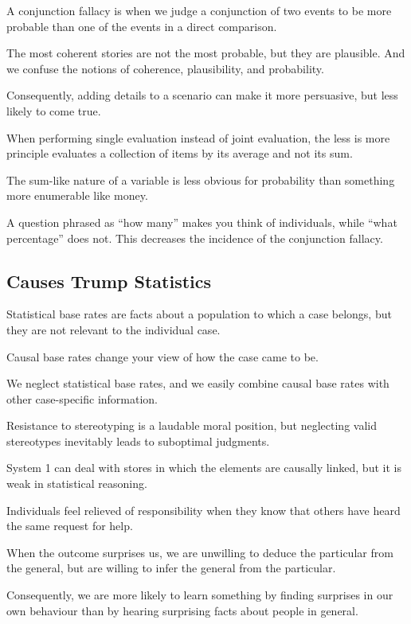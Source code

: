 \bit
\item A conjunction fallacy is when we judge a conjunction of two events to be more probable than one of the events
in a direct comparison.
\item The most coherent stories are not the most probable, but they are plausible. And we confuse the notions of
coherence, plausibility, and probability.
\item Consequently, adding details to a scenario can make it more persuasive, but less likely to come true.
\item When performing single evaluation instead of joint evaluation, the less is more principle evaluates a
collection of items by its average and not its sum.
\item The sum-like nature of a variable is less obvious for probability than something more enumerable like money.
\item A question phrased as ``how many'' makes you think of individuals, while ``what percentage'' does not. This
decreases the incidence of the conjunction fallacy.
\eit

\subsection*{Causes Trump Statistics}

\bit
\item Statistical base rates are facts about a population to which a case belongs, but they are not relevant to the
individual case.
\item Causal base rates change your view of how the case came to be.
\item We neglect statistical base rates, and we easily combine causal base rates with other case-specific information.
\item Resistance to stereotyping is a laudable moral position, but neglecting valid stereotypes inevitably leads to
suboptimal judgments.
\item System 1 can deal with stores in which the elements are causally linked, but it is weak in statistical reasoning.
\item Individuals feel relieved of responsibility when they know that others have heard the same request for help.
\item When the outcome surprises us, we are unwilling to deduce the particular from the general, but are willing to
infer the general from the particular.
\item Consequently, we are more likely to learn something by finding surprises in our own behaviour than by hearing
surprising facts about people in general.
\eit

